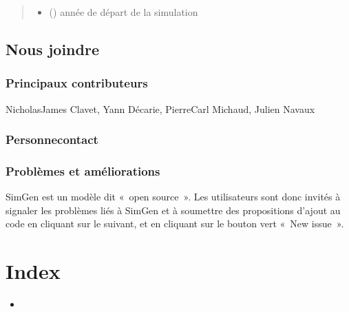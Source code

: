 \documentclass[letterpaper,10pt,french]{sphinxmanual}
\begin{document}
\begin{fulllineitems}
\begin{fulllineitems}
\begin{quote}
\begin{description}
\begin{itemize}
\item {} 
 () \textendash{} année de départ de la simulation

\end{itemize}

\end{description}\end{quote}

\end{fulllineitems}


\end{fulllineitems}



\section{Nous joindre}
\label{\detokenize{credits:nous-joindre}}\label{\detokenize{credits::doc}}

\subsection{Principaux contributeurs}
\label{\detokenize{credits:principaux-contributeurs}}
Nicholas\sphinxhyphen{}James Clavet, Yann Décarie, Pierre\sphinxhyphen{}Carl Michaud, Julien Navaux


\subsection{Personne\sphinxhyphen{}contact}
\label{\detokenize{credits:personne-contact}}


\subsection{Problèmes et améliorations}
\label{\detokenize{credits:problemes-et-ameliorations}}
SimGen est un modèle dit « open source ». Les utilisateurs sont donc invités à signaler les problèmes liés à SimGen et à soumettre des propositions d’ajout au code
en cliquant sur le  suivant, et en cliquant sur le bouton vert « New issue ».


\chapter{Index}
\label{\detokenize{index:index}}\begin{itemize}
\item {} 

\end{itemize}
\end{document}

